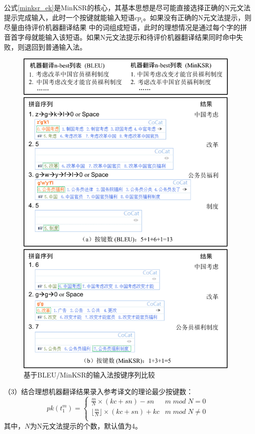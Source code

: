 公式\ref{minksr_ek}是MinKSR的核心，其基本思想是尽可能直接选择正确的N元文法提示完成输入，此时一个按键就能输入短语$cp_i$。如果没有正确的N元文法提示，则尽量由待评价机器翻译结果 中的词组成短语，此时的理想情况是通过每个字的拼音首字母就能输入该短语。如果N元文法提示和待评价机器翻译结果同时命中失败，则退回到普通输入法。

\begin{figure}[!hbt]
	\centering
	\includegraphics[width=0.98\textwidth]{Figure/Figure_3_6.pdf}
	\caption{基于BLEU/MinKSR的输入法按键序列比较}
	\label{Fig_keystroke_bleu_minksr}
\end{figure}

（3）结合理想机器翻译结果录入参考译文的理论最少按键数：
\begin{equation}\label{minksr_pk}
pk (t_1^m) = \left \{ 
	\begin{array}{ll}
		\frac{m}{N} \times (kc+sn)-sn & m\;mod\; N=0 \\
		\lfloor \frac{m}{N} \rfloor \times (kc+sn)+kc & m\;mod\;N \not = 0 \\
	\end{array}
	\right. 
\end{equation}
其中，$N$为N元文法提示的个数，默认值为4。

